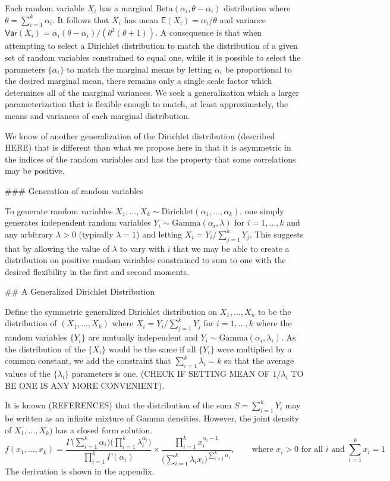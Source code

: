 Each random variable $X_i$ has a marginal $\text{Beta}(\alpha_i,\theta-\alpha_i)$ distribution
where $\theta = \sum_{i=1}^k \alpha_i$.
It follows that $X_i$ has mean $\mathsf{E}(X_i) = \alpha_i/\theta$
and variance $\mathsf{Var}(X_i) = \alpha_i(\theta-\alpha_i) / ( \theta^2(\theta+1) )$.
A consequence is that when attempting to select a Dirichlet distribution to match the distribution
of a given set of random variables constrained to equal one,
while it is possible to select the parameters $\{\alpha_i\}$ to match the marginal means
by letting $\alpha_i$ be proportional to the desired marginal mean,
there remains only a single scale factor which determines all of the marginal variances.
We seek a generalization which a larger parameterization that is flexible enough to match,
at least approximately,
the means and variances of each marginal distribution.

We know of another generalization of the Dirichlet distribution (described HERE)
that is different than what we propose here
in that it is asymmetric in the indices of the random variables
and has the property that some correlations may be positive.

### Generation of random variables

To generate random variables $X_1,\ldots,X_k \sim \text{Dirichlet}(\alpha_1,\ldots,\alpha_k)$,
one simply generates independent random variables $Y_i \sim \text{Gamma}(\alpha_i,\lambda)$
for $i=1,\ldots,k$ and any arbitrary $\lambda>0$ (typically $\lambda=1$)
and letting $X_i = Y_i / \sum_{j=1}^k Y_j$.
This suggests that by allowing the value of $\lambda$ to vary with $i$
that we may be able to create a distribution on positive random variables
constrained to sum to one
with the desired flexibility in the first and second moments.

## A Generalized Dirichlet Distribution

Define the symmetric generalized Dirichlet distribution on $X_1,\ldots,X_n$
to be the distribution of $(X_1,\ldots,X_k)$
where $X_i = Y_i \big/ \sum_{j=1}^k Y_j$ for $i=1,\ldots,k$
where the random variables $\{Y_i\}$ are mutually independent
and $Y_i \sim \text{Gamma}(\alpha_i,\lambda_i)$.
As the distribution of the $\{X_i\}$ would be the same if all $\{Y_i\}$ were multiplied by a common constant,
we add the constraint that $\sum_{i=1}^k \lambda_i = k$
so that the average values of the $\{\lambda_i\}$ parameters is one.
(CHECK IF SETTING MEAN OF $1/\lambda_i$ TO BE ONE IS ANY MORE CONVENIENT).

It is known (REFERENCES) that the distribution of the sum $S = \sum_{i=1}^k Y_i$
may be written as an infinite mixture of Gamma densities.
However,
the joint density of $X_1,\ldots,X_k)$ has a closed form solution.
$$
f(x_1,\ldots,x_k) = \frac{\Gamma\big(\sum_{i=1}^k \alpha_i\big)\big(\prod_{i=1}^k \lambda_i^{\alpha_i}\big)}{\prod_{i=1}^k \Gamma(\alpha_i)} \times \frac{\prod_{i=1}^k x_i^{\alpha_i - 1}}{\big(\sum_{i=1}^k \lambda_i x_i\big)^{\sum_{i=1}^k \alpha_i}}, \qquad \text{where $x_i > 0$ for all $i$ and $\sum_{i=1}^k x_i = 1$}
$$
The derivation is shown in the appendix.

